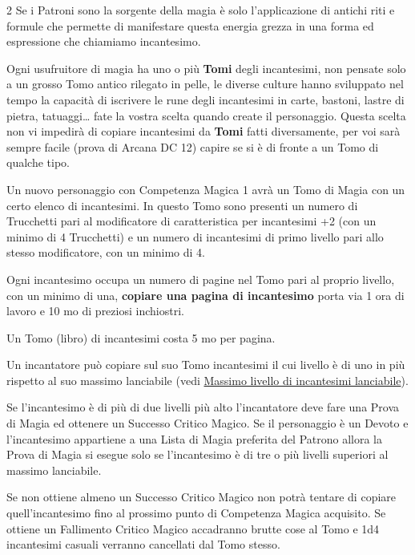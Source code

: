 \begin{multicols}{2}
Se i Patroni sono la sorgente della magia è solo l'applicazione di antichi riti e formule che permette di manifestare questa energia grezza in una forma ed espressione che chiamiamo incantesimo.

Ogni usufruitore di magia ha uno o più \textbf{Tomi} degli incantesimi, non pensate solo a un grosso Tomo antico rilegato in pelle, le diverse culture hanno sviluppato nel tempo la capacità di iscrivere le rune degli incantesimi in carte, bastoni, lastre di pietra, tatuaggi… fate la vostra scelta quando create il personaggio.
Questa scelta non vi impedirà di copiare incantesimi da \textbf{Tomi} fatti diversamente, per voi sarà sempre facile (prova di Arcana DC 12) capire se si è di fronte a un Tomo di qualche tipo.

Un nuovo personaggio con Competenza Magica 1 avrà un Tomo di Magia con un certo elenco di incantesimi. In questo Tomo sono presenti un numero di Trucchetti pari al modificatore di caratteristica per incantesimi +2 (con un minimo di 4 Trucchetti) e un numero di incantesimi di primo livello pari allo stesso modificatore, con un minimo di 4.\label{tomocm1}\hypertarget{tomocm1}{}

Ogni incantesimo occupa un numero di pagine nel Tomo pari al proprio livello, con un minimo di una, \textbf{copiare una pagina di incantesimo} porta via 1 ora di lavoro e 10 mo di preziosi inchiostri.

Un Tomo (libro) di incantesimi costa 5 mo per pagina.

Un incantatore può copiare sul suo Tomo incantesimi il cui livello è di uno in più rispetto al suo massimo lanciabile (vedi \hyperlink{scuoleelivelli}{Massimo livello di incantesimi lanciabile}).

Se l'incantesimo è di più di due livelli più alto l'incantatore deve fare una Prova di Magia ed ottenere un Successo Critico Magico. Se il personaggio è un Devoto e l'incantesimo appartiene a una Lista di Magia preferita del Patrono allora la Prova di Magia si esegue solo se l'incantesimo è di tre o più livelli superiori al massimo lanciabile.

Se non ottiene almeno un Successo Critico Magico non potrà tentare di copiare quell'incantesimo fino al prossimo punto di Competenza Magica acquisito. Se ottiene un Fallimento Critico Magico accadranno brutte cose al Tomo e 1d4 incantesimi casuali verranno cancellati dal Tomo stesso.


\end{multicols}
